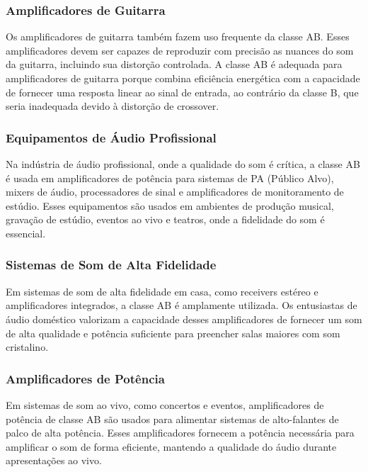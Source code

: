 \subsubsection{Amplificadores de Guitarra}

Os amplificadores de guitarra também fazem uso frequente da classe AB. Esses amplificadores devem ser capazes de reproduzir com precisão as nuances do som da guitarra, incluindo sua distorção controlada. A classe AB é adequada para amplificadores de guitarra porque combina eficiência energética com a capacidade de fornecer uma resposta linear ao sinal de entrada, ao contrário da classe B, que seria inadequada devido à distorção de crossover.

\subsubsection{Equipamentos de Áudio Profissional}

Na indústria de áudio profissional, onde a qualidade do som é crítica, a classe AB é usada em amplificadores de potência para sistemas de PA (Público Alvo), mixers de áudio, processadores de sinal e amplificadores de monitoramento de estúdio. Esses equipamentos são usados em ambientes de produção musical, gravação de estúdio, eventos ao vivo e teatros, onde a fidelidade do som é essencial.

\subsubsection{Sistemas de Som de Alta Fidelidade}

Em sistemas de som de alta fidelidade em casa, como receivers estéreo e amplificadores integrados, a classe AB é amplamente utilizada. Os entusiastas de áudio doméstico valorizam a capacidade desses amplificadores de fornecer um som de alta qualidade e potência suficiente para preencher salas maiores com som cristalino.

\subsubsection{Amplificadores de Potência}

Em sistemas de som ao vivo, como concertos e eventos, amplificadores de potência de classe AB são usados para alimentar sistemas de alto-falantes de palco de alta potência. Esses amplificadores fornecem a potência necessária para amplificar o som de forma eficiente, mantendo a qualidade do áudio durante apresentações ao vivo.

